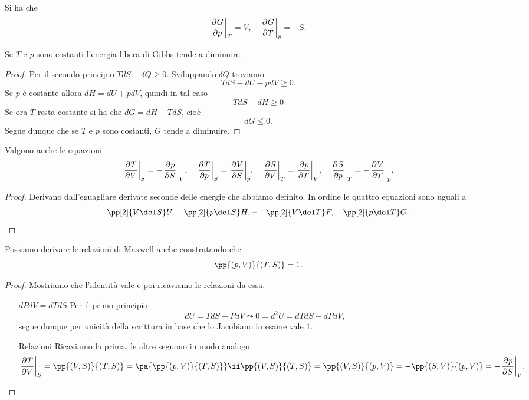 \begin{remark}
Si ha che
\[\ppb pGT=V,\quad \ppb TGp=-S.\]
\end{remark}

\begin{proposition}\label{GibbsDiminuiscePerPressioneETemperaturaCostanti}
Se $T$ e $p$ sono costanti l'energia libera di Gibbs tende a diminuire.
\end{proposition}
\begin{proof}
Per il secondo principio $TdS-\delta Q\geq 0$. Sviluppando $\delta Q$ troviamo
\[TdS-dU-pdV\geq0.\]
Se $p$ \`e costante allora $dH=dU+pdV$, quindi in tal caso
\[TdS-dH\geq 0\]
Se ora $T$ resta costante si ha che $dG=dH-TdS$, cio\`e
\[dG\leq 0.\]
Segue dunque che se $T$ e $p$ sono costanti, $G$ tende a diminuire.
\end{proof}


\begin{proposition}\label{RelazioniMaxwell}
Valgono anche le equazioni
\[\ppb VTS=-\ppb SpV,\quad \ppb pTS=\ppb SVp,\quad \ppb VST=\ppb TpV,\quad \ppb pST=-\ppb TVp.\]
\end{proposition}
\begin{proof}
Derivano dall'eguagliare derivate seconde delle energie che abbiamo definito. In ordine le quattro equazioni sono uguali a
\[\pp[2]{V\del S}U,\quad \pp[2]{p\del S}H,-\quad \pp[2]{V\del T}F,\quad \pp[2]{p\del T}G.\]
\end{proof}

\begin{remark}[Jacobiano $p,V$ - $T,S$]
Possiamo derivare le relazioni di Maxwell anche constratando che
\[\pp{(p,V)}{(T,S)}=1.\]
\end{remark}
\begin{proof}
Mostriamo che l'identit\`a vale e poi ricaviamo le relazioni da essa.
\setlength{\leftmargini}{0cm}
\begin{itemize}
\item[$\boxed{dPdV=dTdS}$] Per il primo principio
\[dU=TdS-PdV\leadsto 0=d^2U=dTdS-dPdV,\]
segue dunque per unicit\`a della scrittura in base che lo Jacobiano in esame vale $1$.
\item[$\boxed{\text{Relazioni}}$] Ricaviamo la prima, le altre seguono in modo analogo
\[\ppb VTS=\pp{(V,S)}{(T,S)}=\pa{\pp{(p,V)}{(T,S)}}\ii\pp{(V,S)}{(T,S)}=\pp{(V,S)}{(p,V)}=-\pp{(S,V)}{(p,V)}=-\ppb SpV.\]
\end{itemize}
\setlength{\leftmargini}{0.5cm}
\end{proof}




